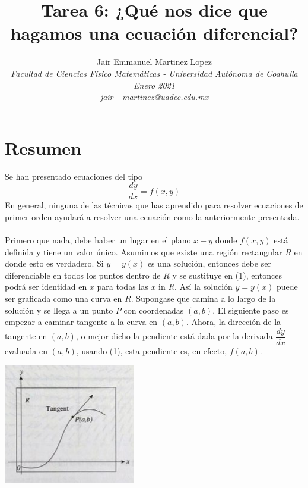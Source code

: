 \documentclass[12pt]{article}
\title{\vspace{-10mm}\fontsize{14pt}{10pt}\textbf{Tarea 6: ¿Qué nos dice que hagamos una ecuación diferencial?}} %
\author{
\normalsize Jair Emmanuel Martinez Lopez\\ %
\textit{\normalsize Facultad de Ciencias Físico Matemáticas - Universidad Autónoma de Coahuila}\\ %
\textit{\normalsize Enero 2021}\\
\textit{\normalsize jair\_ martinez@uadec.edu.mx} %
\vspace{-5mm}
}
\date{}
\begin{document}
\maketitle
\thispagestyle{fancy}

\section*{Resumen}
Se han presentado ecuaciones del tipo
\begin{equation}
	\dfrac{dy}{dx}=f(x,y)
\end{equation}
En general, ninguna de las técnicas que has aprendido para resolver ecuaciones de primer orden ayudará a resolver una ecuación como la anteriormente presentada.\\
\\
Primero que nada, debe haber un lugar en el plano $x-y$ donde $f(x,y)$ está definida y tiene un valor único. Asumimos que existe una región rectangular $R$ en donde esto es verdadero. Si $y=y(x)$ es una solución, entonces debe ser diferenciable en todos los puntos dentro de $R$ y se sustituye en (1), entonces podrá ser identidad en $x$ para todas las $x$ in $R$. Así la solución $y=y(x)$ puede ser graficada como una curva en $R$. Supongase que camina a lo largo de la solución y se llega a un punto $P$ con coordenadas $(a,b)$. El siguiente paso es empezar a caminar tangente a la curva en $(a,b)$. Ahora, la dirección de la tangente en $(a,b)$, o mejor dicho la pendiente está dada por la derivada $\dfrac{dy}{dx}$ evaluada en $(a,b)$, usando (1), esta pendiente es, en efecto, $f(a,b)$.
\begin{center}
	\includegraphics[scale=0.75]{Captura.PNG}
\end{center}
\end{document}
